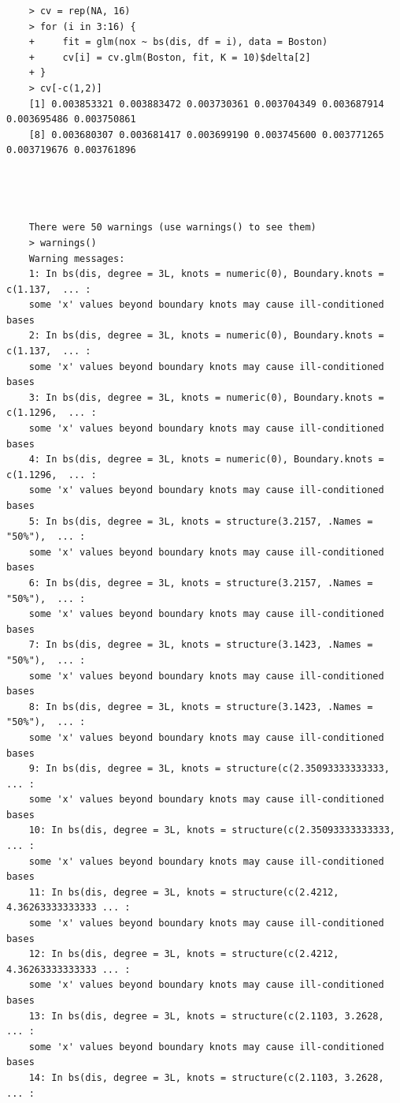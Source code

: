 \documentclass{article}
\begin{document}
\begin{program}
	\begin{verbatim}
	> cv = rep(NA, 16)
	> for (i in 3:16) {
	+     fit = glm(nox ~ bs(dis, df = i), data = Boston)
	+     cv[i] = cv.glm(Boston, fit, K = 10)$delta[2]
	+ }
	> cv[-c(1,2)]
	[1] 0.003853321 0.003883472 0.003730361 0.003704349 0.003687914 0.003695486 0.003750861
	[8] 0.003680307 0.003681417 0.003699190 0.003745600 0.003771265 0.003719676 0.003761896
	
	
	
	
	There were 50 warnings (use warnings() to see them)
	> warnings()
	Warning messages:
	1: In bs(dis, degree = 3L, knots = numeric(0), Boundary.knots = c(1.137,  ... :
	some 'x' values beyond boundary knots may cause ill-conditioned bases
	2: In bs(dis, degree = 3L, knots = numeric(0), Boundary.knots = c(1.137,  ... :
	some 'x' values beyond boundary knots may cause ill-conditioned bases
	3: In bs(dis, degree = 3L, knots = numeric(0), Boundary.knots = c(1.1296,  ... :
	some 'x' values beyond boundary knots may cause ill-conditioned bases
	4: In bs(dis, degree = 3L, knots = numeric(0), Boundary.knots = c(1.1296,  ... :
	some 'x' values beyond boundary knots may cause ill-conditioned bases
	5: In bs(dis, degree = 3L, knots = structure(3.2157, .Names = "50%"),  ... :
	some 'x' values beyond boundary knots may cause ill-conditioned bases
	6: In bs(dis, degree = 3L, knots = structure(3.2157, .Names = "50%"),  ... :
	some 'x' values beyond boundary knots may cause ill-conditioned bases
	7: In bs(dis, degree = 3L, knots = structure(3.1423, .Names = "50%"),  ... :
	some 'x' values beyond boundary knots may cause ill-conditioned bases
	8: In bs(dis, degree = 3L, knots = structure(3.1423, .Names = "50%"),  ... :
	some 'x' values beyond boundary knots may cause ill-conditioned bases
	9: In bs(dis, degree = 3L, knots = structure(c(2.35093333333333,  ... :
	some 'x' values beyond boundary knots may cause ill-conditioned bases
	10: In bs(dis, degree = 3L, knots = structure(c(2.35093333333333,  ... :
	some 'x' values beyond boundary knots may cause ill-conditioned bases
	11: In bs(dis, degree = 3L, knots = structure(c(2.4212, 4.36263333333333 ... :
	some 'x' values beyond boundary knots may cause ill-conditioned bases
	12: In bs(dis, degree = 3L, knots = structure(c(2.4212, 4.36263333333333 ... :
	some 'x' values beyond boundary knots may cause ill-conditioned bases
	13: In bs(dis, degree = 3L, knots = structure(c(2.1103, 3.2628,  ... :
	some 'x' values beyond boundary knots may cause ill-conditioned bases
	14: In bs(dis, degree = 3L, knots = structure(c(2.1103, 3.2628,  ... :

\end{verbatim}
\end{program}
\end{document}
